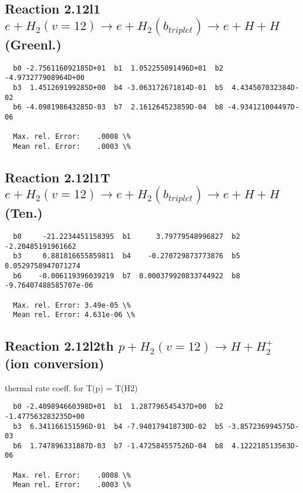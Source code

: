 \documentclass[12pt,dvipdfmx]{article}
\begin{document}
\subsection{
Reaction 2.12l1
$ e + H_2(v=12) \rightarrow e + H_2(b_{triplet}) \rightarrow e + H + H $ (Greenl.)
}


\begin{small}\begin{verbatim}
  b0 -2.756116092185D+01  b1  1.052255091496D+01  b2 -4.973277908964D+00
  b3  1.451269199285D+00  b4 -3.063172671814D-01  b5  4.434507032384D-02
  b6 -4.098198643285D-03  b7  2.161264523859D-04  b8 -4.934121004497D-06

  Max. rel. Error:    .0008 \%
  Mean rel. Error:    .0003 \%
\end{verbatim}\end{small}


\subsection{
Reaction 2.12l1T
$  e + H_2(v=12) \rightarrow e + H_2(b_{triplet})\rightarrow e + H + H $ (Ten.)
}


\begin{small}\begin{verbatim}
  b0     -21.2234451158395  b1      3.79779548996827  b2     -2.20485191961662
  b3     0.881816655859811  b4    -0.270729873773876  b5    0.0529758947071274
  b6    -0.006119396039219  b7  0.000379920833744922  b8 -9.76407488585707e-06

  Max. rel. Error: 3.49e-05 \%
  Mean rel. Error: 4.631e-06 \%
\end{verbatim}\end{small}

\subsection{
Reaction 2.12l2th
$ p + H_2(v=12) \rightarrow H + H_2^+$ (ion conversion)
}
thermal rate coeff. for T(p) = T(H2)

\begin{small}\begin{verbatim}
  b0 -2.409894660398D+01  b1  1.287796545437D+00  b2 -1.477563283235D+00
  b3  6.341166151596D-01  b4 -7.940179418730D-02  b5 -3.857236994575D-03
  b6  1.747896331887D-03  b7 -1.472584557526D-04  b8  4.122218513563D-06

  Max. rel. Error:    .0008 \%
  Mean rel. Error:    .0003 \%
\end{verbatim}\end{small}
\end{document}
